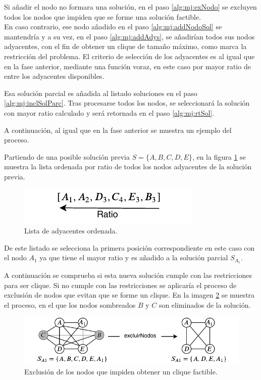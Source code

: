 Si añadir el nodo no formara una solución, en el paso \ref{alg:mj:exNodo} se excluyen todos los nodos que impiden que se forme una solución factible.\\
En caso contrario, ese nodo añadido en el paso \ref{alg:mj:addNodoSol} se mantendría y a su vez, en el paso \ref{alg:mj:addAdys}, se añadirían todos sus nodos adyacentes, con el fin de obtener un clique de tamaño máximo, como marca la restricción del problema. El criterio de selección de los adyacentes es al igual que en la fase anterior, mediante una función voraz, en este caso por mayor ratio de entre los adyacentes disponibles.


Esa solución parcial es añadida al listado soluciones en el paso \ref{alg:mj:inclSolParc}. Tras procesarse todos los nodos, se seleccionará la solución con mayor ratio calculado y será retornada en el paso \ref{alg:mj:rtSol}.

A continuación, al igual que en la fase anterior se muestra un ejemplo del proceso.

Partiendo de una posible solución previa $ S=\{A, B, C, D, E\} $, en la figura \ref{fig:bl:adys} se muestra la lista ordenada por ratio de todos los nodos adyacentes de la solución previa. 

\begin{figure}[H]
	\centering
	\includegraphics[scale=2]{Figures/proc-bl/adys-ord.pdf}
	\caption{\footnotesize Lista de adyacentes ordenada.}
	\label{fig:bl:adys}
\end{figure}

De este listado se selecciona la primera posición correspondiente en este caso con el nodo $A_1$ ya que tiene el mayor ratio y es añadido a la solución parcial $S_{A_1}$.

A continuación se comprueba si esta nueva solución cumple con las restricciones para ser clique. Si no cumple con las restricciones se aplicaría el proceso de exclusión de nodos que evitan que se forme un clique. En la imagen \ref{fig:bl:exc} se muestra el proceso, en el que los nodos sombreados $B$ y $C$ son eliminados de la solución.

\begin{figure}[H]
	\centering
	\includegraphics[scale=1.3]{Figures/proc-bl/excluirNodos.pdf}
	\caption{\footnotesize Exclusión de los nodos que impiden obtener un clique factible.}
	\label{fig:bl:exc}
\end{figure}

